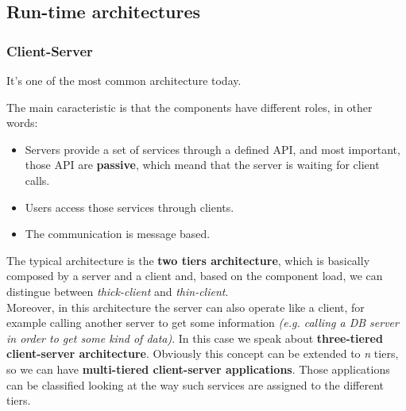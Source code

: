 \subsection{Run-time architectures}

    \subsubsection{Client-Server}
    It's one of the most common architecture today.

    The main caracteristic is that the components have different roles, in other words: 
    \begin{itemize}
        \item Servers provide a set of services through a defined API, and most important, those API are \textbf{passive}, which meand that the server is waiting for client calls.
        \item Users access those services through clients.
        \item The communication is message based.
    \end{itemize}

    The typical architecture is the \textbf{two tiers architecture}, which is basically
    composed by a server and a client and, based on the component load, we can distingue between
    \textit{thick-client} and \textit{thin-client}.\\
    Moreover, in this architecture the server can also operate like a client, 
    for example calling another server to get some information 
    \textit{(e.g. calling a DB server in order to get some kind of data)}. 
    In this case we speak about \textbf{three-tiered client-server architecture}. 
    Obviously this concept can be extended to \textit{n} tiers, so we can have \textbf{multi-tiered client-server applications}.
    Those applications can be classified looking at the way such services are assigned to the different tiers.

